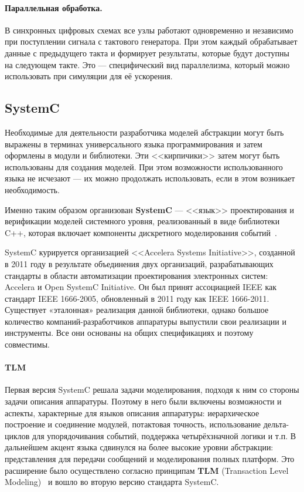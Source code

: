\paragraph{Параллельная обработка.} В синхронных цифровых схемах все узлы работают одновременно и независимо при поступлении сигнала с тактового генератора. При этом каждый обрабатывает данные с предыдущего такта и формирует результаты, которые будут доступны на следующем такте. Это --- специфический вид параллелизма, который можно использовать при симуляции для её ускорения.

\subsection{SystemC}

Необходимые для деятельности разработчика моделей абстракции могут быть выражены в терминах универсального языка программирования и затем оформлены в модули и библиотеки. Эти <<кирпичики>> затем могут быть использованы для создания моделей. При этом возможности использованного языка не исчезают --- их можно продолжать использовать, если в этом возникает необходимость.

Именно таким образом организован \textbf{SystemC} --- <<язык>> проектирования и верификации моделей системного уровня, реализованный в виде библиотеки C++, которая включает компоненты дискретного моделирования событий~\cite{systemc2006}. 

SystemC курируется организацией <<Accelera Systems Initiative>>, созданной в 2011 году в результате объединения двух организаций, разрабатывающих стандарты в области автоматизации проектирования электронных систем: Accelera и Open SystemC Initiative. Он был принят ассоциацией IEEE как стандарт IEEE 1666-2005, обновленный в 2011 году как IEEE 1666-2011. Существует «эталонная» реализация данной библиотеки, однако большое количество компаний-разработчиков аппаратуры  выпустили свои реализации и инструменты. Все они основаны на общих спецификациях и поэтому совместимы.

\paragraph{TLM} Первая версия SystemC решала задачи моделирования, подходя к ним со стороны задачи описания аппаратуры. Поэтому в него были включены возможности и аспекты, характерные для языков описания аппаратуры: иерархическое построение и соединение модулей, потактовая точность, использование дельта-циклов для упорядочивания событий, поддержка четырёхзначной логики и т.п.
В дальнейшем акцент языка сдвинулся на более высокие уровни абстракции: представления для передачи сообщений и моделирования полных платформ. Это расширение было осуществлено согласно принципам \textbf{TLM} (\abbr Transaction Level Modeling)~\cite{tlm2003} и вошло во вторую версию стандарта SystemC. 

